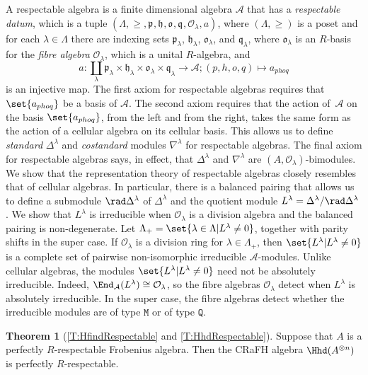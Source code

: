 \documentclass[a4paper,11pt]{amsart}
\numberwithin{equation}{subsection}
\theoremstyle{definition}
\theoremstyle{theorem}
\newcounter{maintheorem}
\newtheorem{MainTheorem}[maintheorem]{Theorem}
\theoremstyle{remark}
\newcommand\CA{\mathcal{A}}
\newcommand\CO{\mathcal{O}}
\newcommand\plam[1][\lambda]{\mathfrak{p}_{#1}}
\newcommand\hlam[1][\lambda]{\mathfrak{h}_{#1}}
\newcommand\qlam[1][\lambda]{\mathfrak{q}_{#1}}
\newcommand\Olam[1][\lambda]{\CO_{#1}}
\newcommand\olam[1][\lambda]{\mathfrak{o}_{#1}}
\begin{document}
A respectable algebra is a finite dimensional algebra $\CA$ that
has a \emph{respectable datum}, which is a tuple
$(\Lambda,\ge,\plam[],\hlam[],\olam[],\qlam[],\Olam{},a)$, where
$(\Lambda,\ge)$ is a poset and for each $\lambda\in\Lambda$ there are
indexing sets $\plam$, $\hlam$, $\olam$, and $\qlam$, where $\olam$ is
an $R$-basis for the \emph{fibre algebra} $\Olam$, which is a unital
$R$-algebra, and
\[
  a\colon\coprod_\lambda\plam\times\hlam\times\olam\times\qlam\to \CA;
  (p,h,o,q)\mapsto a_{phoq}
\]
is an injective map. The first axiom for
respectable algebras requires that $\set{a_{phoq}}$ be a basis of $\CA$.
The second axiom requires that the action of~$\CA$ on the basis
$\set{a_{phoq}}$, from the left and from the right, takes the same form as
the action of a cellular algebra on its cellular basis. This allows us
to define \emph{standard} $\Delta^\lambda$ and \emph{costandard} modules
$\nabla^\lambda$ for respectable algebras. The final axiom for
respectable algebras says, in effect, that $\Delta^\lambda$ and
$\nabla^\lambda$ are $(A,\Olam)$-bimodules. We show that the
representation theory of respectable algebras closely resembles that of
cellular algebras. In particular, there is a balanced pairing that
allows us to define a submodule $\rad\Delta^\lambda$ of $\Delta^\lambda$
and the quotient module $L^\lambda=\Delta^\lambda/\rad\Delta^\lambda$.
We show that $L^\lambda$ is irreducible when $\Olam$ is a division
algebra and the balanced pairing is non-degenerate. Let
$\Lambda_+=\set{\lambda\in\Lambda|L^\lambda\ne0}$, together with parity
shifts in the super case. If $\Olam$ is a division ring for
$\lambda\in\Lambda_+$, then $\set{L^\lambda|L^\lambda\ne0}$ is a
complete set of pairwise non-isomorphic irreducible $\CA$-modules. Unlike
cellular algebras, the modules $\set{L^\lambda|L^\lambda\ne0}$ need not
be absolutely irreducible. Indeed, $\End_\CA(L^\lambda)\cong\Olam$, so the
fibre algebras $\Olam$ detect when $L^\lambda$ is absolutely
irreducible. In the super case, the fibre algebras detect whether the
irreducible modules are of type $\mathtt{M}$ or of type $\mathtt{Q}$.

\begin{MainTheorem}[\autoref{T:HfindRespectable} and
   \autoref{T:HhdRespectable}]
   Suppose that $A$ is a perfectly $R$-respectable Frobenius algebra. Then
   the CRaFH algebra $\Hhd(A^{\otimes n})$ is perfectly $R$-respectable.
\end{MainTheorem}
\end{document}
